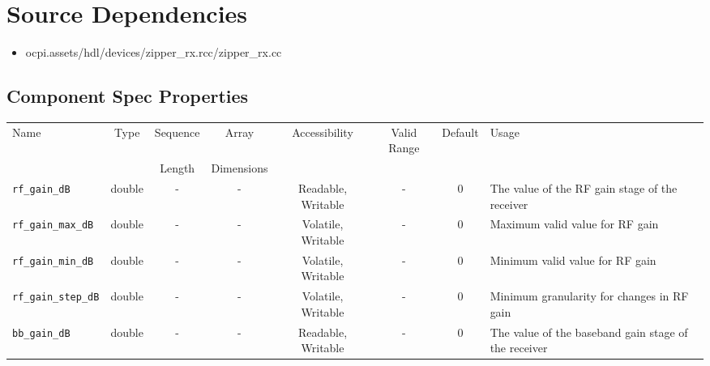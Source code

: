 \documentclass{article}
\begin{document}
\section*{Source Dependencies}
\begin{itemize}
	\item ocpi.assets/hdl/devices/zipper\_rx.rcc/zipper\_rx.cc
\end{itemize}

\begin{landscape}
	\section*{Component Spec Properties}
	\begin{scriptsize}
		\begin{tabular}{|p{4cm}|c|c|c|c|c|c|p{8cm}|}
			\hline
			\rowcolor{blue}
			Name                                & Type   & Sequence & Array      & Accessibility       & Valid Range & Default & Usage                                                                                      \\
			\rowcolor{blue}
			                                    &        & Length   & Dimensions &                     &             &         &                                                                                            \\
			\hline
			\verb+rf_gain_dB+                   & double & -        & -          & Readable, Writable  & -           & 0       & The value of the RF gain stage of the receiver                                             \\
			\hline
			\verb+rf_gain_max_dB+               & double & -        & -          & Volatile, Writable & -           & 0       & Maximum valid value for RF gain                                                            \\
			\hline
			\verb+rf_gain_min_dB+               & double & -        & -          & Volatile, Writable & -           & 0       & Minimum valid value for RF gain                                                            \\
			\hline
			\verb+rf_gain_step_dB+              & double & -        & -          & Volatile, Writable & -           & 0       & Minimum granularity for changes in RF gain                                                 \\
			\hline
			\verb+bb_gain_dB+                   & double & -        & -          & Readable, Writable  & -           & 0       & The value of the baseband gain stage of the receiver                                       \\

\end{tabular}
\end{scriptsize}
\end{landscape}
\end{document}
